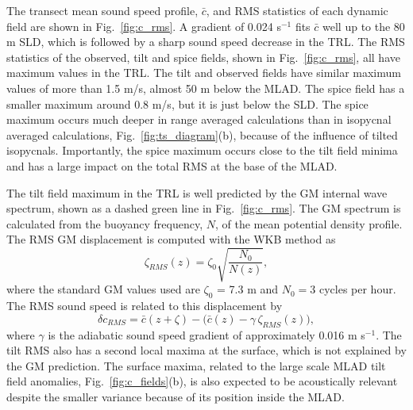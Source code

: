 \documentclass[preprint,NumberedRefs]{JASA}
\begin{document}
The transect mean sound speed profile, $\bar{c}$, and RMS statistics of each dynamic field are shown in Fig.~\ref{fig:c_rms}. A gradient of 0.024 s$^{-1}$ fits $\bar{c}$ well up to the 80 m SLD, which is followed by a sharp sound speed decrease in the TRL. The RMS statistics of the observed, tilt and spice fields, shown in Fig.~\ref{fig:c_rms}, all have maximum values in the TRL. The tilt and observed fields have similar maximum values of more than 1.5 m/s, almost 50 m below the MLAD. The spice field has a smaller maximum around 0.8 m/s, but it is just below the SLD. The spice maximum occurs much deeper in range averaged calculations than in isopycnal averaged calculations, Fig.~\ref{fig:ts_diagram}(b), because of the influence of tilted isopycnals.\citep{ferrari2000} Importantly, the spice maximum occurs close to the tilt field minima and has a large impact on the total RMS at the base of the MLAD.

The tilt field maximum in the TRL is well predicted by the GM internal wave spectrum, shown as a dashed green line in Fig.~\ref{fig:c_rms}. The GM spectrum is calculated from the buoyancy frequency, $N$, of the mean potential density profile. The RMS GM displacement is computed with the WKB method as
\begin{equation*}
    \zeta_{RMS}(z) = \zeta_0 \sqrt{\frac{N_0}{N(z)}},
\end{equation*}
where the standard GM values used are $\zeta_0$ = 7.3 m and $N_0=3$ cycles per hour. The RMS sound speed is related to this displacement by
\begin{equation*}
    \delta c_{RMS} = \bar{c}(z+\zeta)-\big(\bar{c}(z) - \gamma \, \zeta_{RMS}(z)\big),
\end{equation*}
where $\gamma$ is the adiabatic sound speed gradient of approximately 0.016 m s$^{-1}$. The tilt RMS also has a second local maxima at the surface, which is not explained by the GM prediction. The surface maxima, related to the large scale MLAD tilt field anomalies, Fig.~\ref{fig:c_fields}(b), is also expected to be acoustically relevant despite the smaller variance because of its position inside the MLAD.
\end{document}
